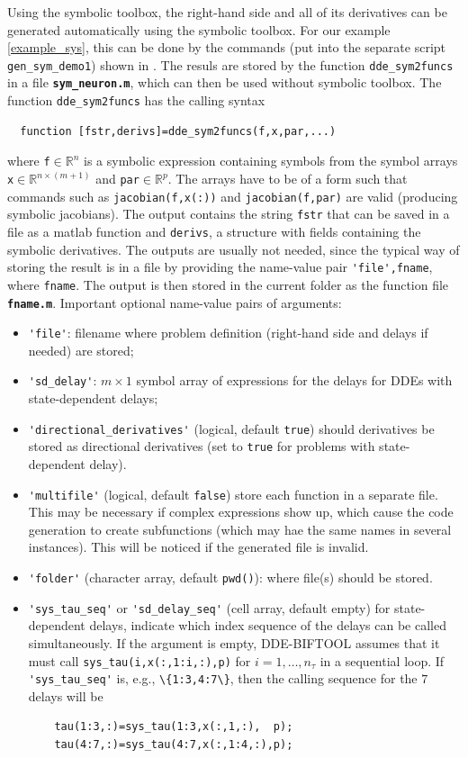 \documentclass[10pt]{scrartcl}
\newcommand{\DDEBIFCODE}{\textsc{DDE-BIFTOOL}}
\newcommand{\file}[1]{\textbf{\texttt{#1}}}
\newcommand{\blist}[1]{\mbox{\lstinline!#1!}}
\begin{document}
Using the symbolic toolbox, the right-hand side and all of its
derivatives can be generated automatically using the symbolic
toolbox. For our example \eqref{example_sys}, this can be done by the
commands (put into the separate script \texttt{gen\_sym\_demo1}) shown
in .  The resuls are stored by the function
\blist{dde_sym2funcs} in a file \file{sym\_neuron.m}, which can then
be used without symbolic toolbox. The function \blist{dde_sym2funcs} has the calling syntax
\begin{lstlisting}
  function [fstr,derivs]=dde_sym2funcs(f,x,par,...)
\end{lstlisting}
where \blist{f}$\in\mathbb{R}^n$ is a symbolic expression containing
symbols from the symbol arrays \blist{x}$\in\mathbb{R}^{n\times(m+1)}$
and \blist{par}$\in\mathbb{R}^p$. The arrays have to be of a form such
that commands such as \blist{jacobian(f,x(:))} and
\blist{jacobian(f,par)} are valid (producing symbolic jacobians). The
output contains the string \blist{fstr} that can be saved in a file as
a matlab function and \blist{derivs}, a structure with fields
containing the symbolic derivatives. The outputs are usually not
needed, since the typical way of storing the result is in a file by
providing the name-value pair \blist{'file',fname}, where
\blist{fname}. The output is then stored in the current folder as the
function file \file{fname.m}. Important optional name-value pairs of arguments:
\begin{itemize}
\item \blist{'file'}: filename where problem definition (right-hand side and delays if needed) are stored;
\item \blist{'sd_delay'}: $m\times1$ symbol array of expressions for
  the delays for DDEs with state-dependent delays;
\item \blist{'directional_derivatives'} (logical, default
  \blist{true}) should derivatives be stored as directional
  derivatives (set to \blist{true} for problems with state-dependent delay).
\item \blist{'multifile'} (logical, default \blist{false}) store each
  function in a separate file. This may be necessary if complex
  expressions show up, which cause the code generation to create
  subfunctions (which may hae the same names in several
  instances). This will be noticed if the generated file is invalid.
\item \blist{'folder'} (character array, default \blist{pwd()}): where file(s) should be stored.
\item \blist{'sys_tau_seq'} or \blist{'sd_delay_seq'} (cell array, default empty) for
  state-dependent delays, indicate which index sequence of the delays
  can be called simultaneously. If the argument is empty, {\DDEBIFCODE} assumes that it must call \blist{sys_tau(i,x(:,1:i,:),p)} for $i=1,\ldots,n_\tau$ in a sequential loop. If \blist{'sys_tau_seq'} is, e.g.,  \blist{\{1:3,4:7\}}, then the calling sequence for the $7$ delays will be
  \begin{lstlisting}
    tau(1:3,:)=sys_tau(1:3,x(:,1,:),  p);
    tau(4:7,:)=sys_tau(4:7,x(:,1:4,:),p);    
  \end{lstlisting}
\end{itemize}
\end{document}
